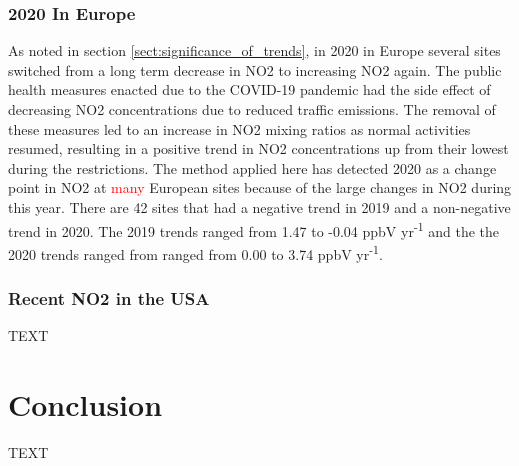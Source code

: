 \documentclass[journal abbreviation, manuscript]{copernicus}
\begin{document}
\subsubsection{2020 In Europe} \label{sect:2020_in_europe}
As noted in section \ref{sect:significance_of_trends}, in 2020 in Europe several sites switched from a long term decrease in NO2 to increasing NO2 again. The public health measures enacted due to the COVID-19 pandemic had the side effect of decreasing NO2 concentrations due to reduced traffic emissions. The removal of these measures led to an increase in NO2 mixing ratios as normal activities resumed, resulting in a positive trend in NO2 concentrations up from their lowest during the restrictions. The method applied here has detected 2020 as a change point in NO2 at \textcolor{red}{many} European sites because of the large changes in NO2 during this year. There are 42 sites that had a negative trend in 2019 and a non-negative trend in 2020. The 2019 trends ranged from 1.47 to -0.04 ppbV yr\textsuperscript{-1} and the the 2020 trends ranged from ranged from 0.00 to 3.74 ppbV yr\textsuperscript{-1}. %


\subsubsection{Recent NO2 in the USA} 
TEXT

\section{Conclusion}  %
TEXT






\end{document}
